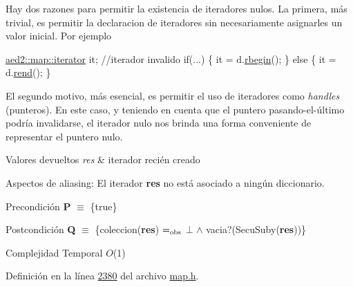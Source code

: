 Hay dos razones para permitir la existencia de iteradores nulos. La primera, más trivial, es permitir la declaracion de iteradores sin necesariamente asignarles un valor inicial. Por ejemplo 
\begin{DoxyCode}
\hyperlink{classaed2_1_1map_1_1iterator}{aed2::map::iterator} it;   \textcolor{comment}{//iterador invalido}
\textcolor{keywordflow}{if}(...) \{
  it = d.\hyperlink{classaed2_1_1map_ac412d3902112122c1bffe2d4283a4e9d_ac412d3902112122c1bffe2d4283a4e9d}{rbegin}();
\} \textcolor{keywordflow}{else} \{
  it = d.\hyperlink{classaed2_1_1map_a277f03b4f4b6b98879e4e4921081801f_a277f03b4f4b6b98879e4e4921081801f}{rend}();
\}
\end{DoxyCode}
 El segundo motivo, más esencial, es permitir el uso de iteradores como {\itshape handles} (punteros). En este caso, y teniendo en cuenta que el puntero pasando-\/el-\/último podría invalidarse, el iterador nulo nos brinda una forma conveniente de representar el puntero nulo.


\begin{DoxyRetVals}{Valores devueltos}
{\em res} & iterador recién creado\\
\hline
\end{DoxyRetVals}
\begin{DoxyParagraph}{Aspectos de aliasing\+:}
El iterador {\bfseries res} no está asociado a ningún diccionario.
\end{DoxyParagraph}
\begin{DoxyPrecond}{Precondición}
{\bfseries P} $\equiv$ \{true\} 
\end{DoxyPrecond}
\begin{DoxyPostcond}{Postcondición}
{\bfseries Q} $\equiv$ \{coleccion({\bfseries res}) $=_{\rm obs}$ $\bot$ $\land$ vacia?(Secu\+Suby({\bfseries res}))\}
\end{DoxyPostcond}

\begin{DoxyDescription}
\item[Complejidad Temporal]$O$(1)
\end{DoxyDescription}

Definición en la línea \hyperlink{map_8h_source_l02380}{2380} del archivo \hyperlink{map_8h_source}{map.\+h}.

